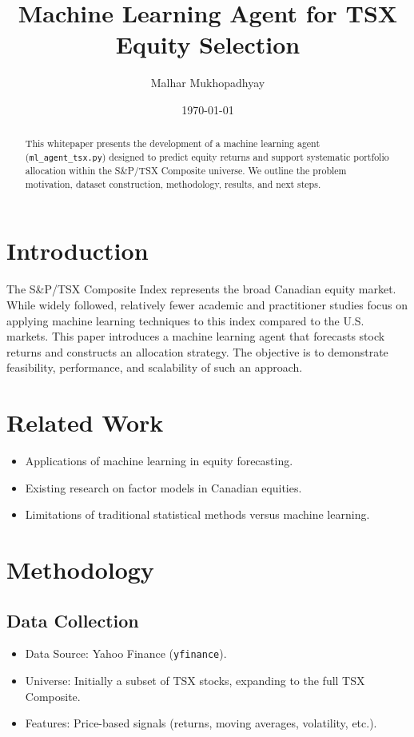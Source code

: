 \documentclass[11pt]{article}
\title{\textbf{Machine Learning Agent for TSX Equity Selection}}
\author{Malhar Mukhopadhyay}
\date{\today}
\begin{document}
\maketitle

\begin{abstract}
This whitepaper presents the development of a machine learning agent (\texttt{ml\_agent\_tsx.py}) designed to predict equity returns and support systematic portfolio allocation within the S\&P/TSX Composite universe. We outline the problem motivation, dataset construction, methodology, results, and next steps.
\end{abstract}

\tableofcontents
\newpage

\section{Introduction}
The S\&P/TSX Composite Index represents the broad Canadian equity market. While widely followed, relatively fewer academic and practitioner studies focus on applying machine learning techniques to this index compared to the U.S. markets. This paper introduces a machine learning agent that forecasts stock returns and constructs an allocation strategy. The objective is to demonstrate feasibility, performance, and scalability of such an approach.

\section{Related Work}
\begin{itemize}
    \item Applications of machine learning in equity forecasting.
    \item Existing research on factor models in Canadian equities.
    \item Limitations of traditional statistical methods versus machine learning.
\end{itemize}

\section{Methodology}
\subsection{Data Collection}
\begin{itemize}
    \item Data Source: Yahoo Finance (\texttt{yfinance}).
    \item Universe: Initially a subset of TSX stocks, expanding to the full TSX Composite.
    \item Features: Price-based signals (returns, moving averages, volatility, etc.).
\end{itemize}
\end{document}
